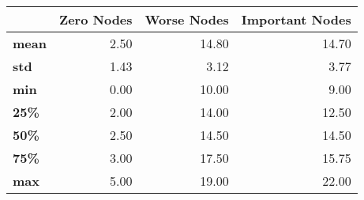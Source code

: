 \begin{tabular}{lrrr}
\toprule
{} &  Zero Nodes &  Worse Nodes &  Important Nodes \\
\midrule
\textbf{mean} &        2.50 &        14.80 &            14.70 \\
\textbf{std } &        1.43 &         3.12 &             3.77 \\
\textbf{min } &        0.00 &        10.00 &             9.00 \\
\textbf{25\% } &        2.00 &        14.00 &            12.50 \\
\textbf{50\% } &        2.50 &        14.50 &            14.50 \\
\textbf{75\% } &        3.00 &        17.50 &            15.75 \\
\textbf{max } &        5.00 &        19.00 &            22.00 \\
\bottomrule
\end{tabular}
